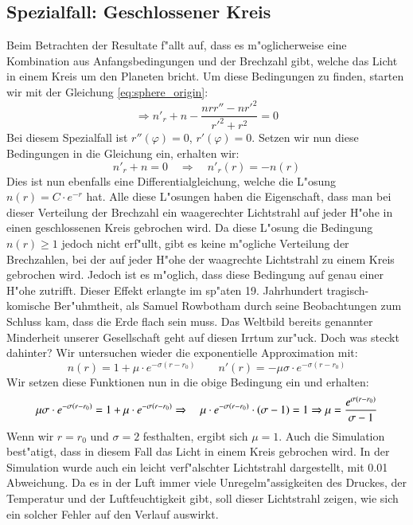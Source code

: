 \begin{refsection}
\subsection{Spezialfall: Geschlossener Kreis}
Beim Betrachten der Resultate f"allt auf, dass es m"oglicherweise eine Kombination aus Anfangsbedingungen und der Brechzahl gibt, welche das Licht in einem Kreis um den Planeten bricht. 
Um diese Bedingungen zu finden, starten wir mit der Gleichung \ref{eq:sphere_origin}:
$$\Rightarrow n'_r + n - \frac{n r r'' - n r'^2}{r'^2 + r^2} = 0$$
Bei diesem Spezialfall ist $r''(\varphi) = 0$, $r'(\varphi) = 0$. 
Setzen wir nun diese Bedingungen in die Gleichung ein, erhalten wir:
$$n'_r + n = 0 \quad \Rightarrow \quad n'_r(r) = -n(r)$$
Dies ist nun ebenfalls eine Differentialgleichung, welche die L"osung $n(r) = C \cdot e^{-r}$ hat.
Alle diese L"osungen haben die Eigenschaft, dass man bei dieser Verteilung der Brechzahl ein waagerechter Lichtstrahl auf jeder H"ohe in einen geschlossenen Kreis gebrochen wird.
Da diese L"osung die Bedingung $n(r) \geq 1$ jedoch nicht erf"ullt, gibt es keine m"ogliche Verteilung der Brechzahlen, bei der auf jeder H"ohe der waagrechte Lichtstrahl zu einem Kreis gebrochen wird. 
Jedoch ist es m"oglich, dass diese Bedingung auf genau einer H"ohe zutrifft. 
Dieser Effekt erlangte im sp"aten 19. Jahrhundert tragisch-komische Ber"uhmtheit, als Samuel Rowbotham durch seine Beobachtungen zum Schluss kam, dass die Erde flach sein muss. 
Das Weltbild bereits genannter Minderheit\cite{licht:flatearthsociety} unserer Gesellschaft geht auf diesen Irrtum zur"uck. Doch was steckt dahinter? 
Wir untersuchen wieder die exponentielle Approximation mit:
$$n(r) = 1 + \mu \cdot e^{-\sigma (r-r_0)} \qquad n'(r) = -\mu \sigma \cdot e^{-\sigma (r-r_0)}$$
Wir setzen diese Funktionen nun in die obige Bedingung ein und erhalten:
$$\mu \sigma \cdot e^{-\sigma (r-r_0)} = 1 + \mu \cdot e^{-\sigma (r-r_0)} \quad \\
\Rightarrow \quad \mu \cdot e^{-\sigma (r-r_0)} \cdot (\sigma - 1) = 1 \\
\Rightarrow \mu = \frac{e^{\sigma (r-r_0)}}{\sigma - 1}$$
Wenn wir $r = r_0$ und $\sigma = 2$ festhalten, ergibt sich $\mu = 1$. 
Auch die Simulation best"atigt, dass in diesem Fall das Licht in einem Kreis gebrochen wird.
In der Simulation wurde auch ein leicht verf"alschter Lichtstrahl dargestellt, mit 0.01 Abweichung. 
Da es in der Luft immer viele Unregelm"assigkeiten des Druckes, der Temperatur und der Luftfeuchtigkeit gibt, soll dieser Lichtstrahl zeigen, wie sich ein solcher Fehler auf den Verlauf auswirkt.

\end{refsection}
